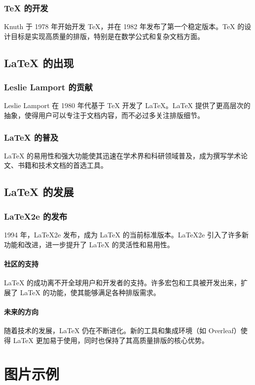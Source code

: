 \documentclass[UTF8,AutoFakeBold=1,AutoFakeSlant,zihao=-4]{SCAU}
\begin{document}
{\subsubsection{TeX 的开发}
Knuth 于 1978 年开始开发 TeX，并在 1982 年发布了第一个稳定版本。TeX 的设计目标是实现高质量的排版，特别是在数学公式和复杂文档方面。

\subsection{LaTeX 的出现}
\subsubsection{Leslie Lamport 的贡献}
Leslie Lamport 在 1980 年代基于 TeX 开发了 LaTeX。LaTeX 提供了更高层次的抽象，使得用户可以专注于文档内容，而不必过多关注排版细节。

\subsubsection{LaTeX 的普及}
LaTeX 的易用性和强大功能使其迅速在学术界和科研领域普及，成为撰写学术论文、书籍和技术文档的首选工具。

\subsection{LaTeX 的发展}
\subsubsection{LaTeX2e 的发布}
1994 年，LaTeX2e 发布，成为 LaTeX 的当前标准版本。LaTeX2e 引入了许多新功能和改进，进一步提升了 LaTeX 的灵活性和易用性。



\paragraph{社区的支持}
LaTeX 的成功离不开全球用户和开发者的支持。许多宏包和工具被开发出来，扩展了 LaTeX 的功能，使其能够满足各种排版需求。

\paragraph{未来的方向}
随着技术的发展，LaTeX 仍在不断进化。新的工具和集成环境（如 Overleaf）使得 LaTeX 更加易于使用，同时也保持了其高质量排版的核心优势。


\section{图片示例}

}
\end{document}
